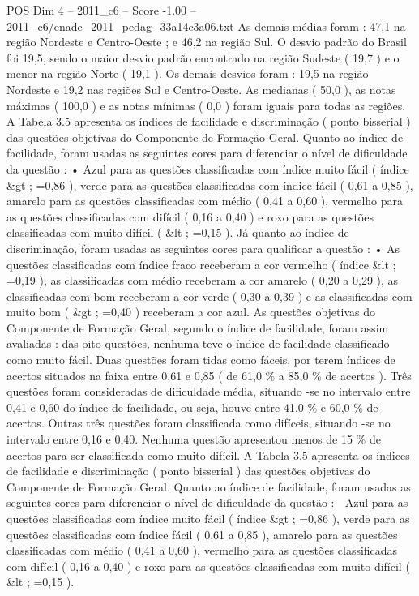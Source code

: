 \begin{textsample}{POS Dim 4 – 2011\_c6 – Score -1.00 – 2011\_c6/enade\_2011\_pedag\_33a14c3a06.txt}
As demais médias foram : 47,1 na região Nordeste e Centro-Oeste ; e 46,2 na região Sul.
O desvio padrão do Brasil foi 19,5, sendo o maior desvio padrão encontrado na região Sudeste ( 19,7 ) e o menor na região Norte ( 19,1 ).
Os demais desvios foram : 19,5 na região Nordeste e 19,2 nas regiões Sul e Centro-Oeste.
As medianas ( 50,0 ), as notas máximas ( 100,0 ) e as notas mínimas ( 0,0 ) foram iguais para todas as regiões.
A Tabela 3.5 apresenta os índices de facilidade e discriminação ( ponto bisserial ) das questões objetivas do Componente de Formação Geral.
Quanto ao índice de facilidade, foram usadas as seguintes cores para diferenciar o nível de dificuldade da questão : • Azul para as questões classificadas com índice muito fácil ( índice \&gt ; =0,86 ), verde para as questões classificadas com índice fácil ( 0,61 a 0,85 ), amarelo para as questões classificadas com médio ( 0,41 a 0,60 ), vermelho para as questões classificadas com difícil ( 0,16 a 0,40 ) e roxo para as questões classificadas com muito difícil ( \&lt ; =0,15 ).
Já quanto ao índice de discriminação, foram usadas as seguintes cores para qualificar a questão : • As questões classificadas com índice fraco receberam a cor vermelho ( índice \&lt ; =0,19 ), as classificadas com médio receberam a cor amarelo ( 0,20 a 0,29 ), as classificadas com bom receberam a cor verde ( 0,30 a 0,39 ) e as classificadas com muito bom ( \&gt ; =0,40 ) receberam a cor azul.
As questões objetivas do Componente de Formação Geral, segundo o índice de facilidade, foram assim avaliadas : das oito questões, nenhuma teve o índice de facilidade classificado como muito fácil.
Duas questões foram tidas como fáceis, por terem índices de acertos situados na faixa entre 0,61 e 0,85 ( de 61,0 \% a 85,0 \% de acertos ).
Três questões foram consideradas de dificuldade média, situando -se no intervalo entre 0,41 e 0,60 do índice de facilidade, ou seja, houve entre 41,0 \% e 60,0 \% de acertos.
Outras três questões foram classificada como difíceis, situando -se no intervalo entre 0,16 e 0,40.
Nenhuma questão apresentou menos de 15 \% de acertos para ser classificada como muito difícil.
A Tabela 3.5 apresenta os índices de facilidade e discriminação ( ponto bisserial ) das questões objetivas do Componente de Formação Geral.
Quanto ao índice de facilidade, foram usadas as seguintes cores para diferenciar o nível de dificuldade da questão :  Azul para as questões classificadas com índice muito fácil ( índice \&gt ; =0,86 ), verde para as questões classificadas com índice fácil ( 0,61 a 0,85 ), amarelo para as questões classificadas com médio ( 0,41 a 0,60 ), vermelho para as questões classificadas com difícil ( 0,16 a 0,40 ) e roxo para as questões classificadas com muito difícil ( \&lt ; =0,15 ).

\end{textsample}
